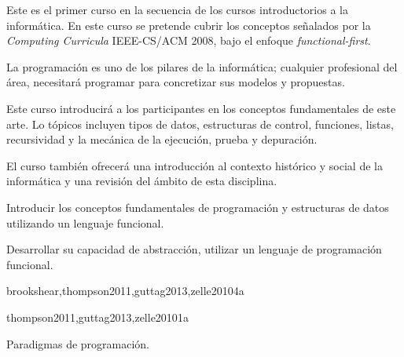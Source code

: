 \begin{syllabus}


\begin{justification}
Este es el primer curso en la secuencia de los cursos introductorios a la informática. En este curso se pretende cubrir los conceptos señalados por la \textit{Computing Curricula} IEEE-CS/ACM 2008, bajo el enfoque \textit{functional-first}.

La programación es uno de los pilares de la informática; cualquier profesional del área, necesitará programar para concretizar sus modelos y propuestas.

Este curso introducirá a los participantes en los conceptos fundamentales de este arte. Lo tópicos incluyen tipos de datos, estructuras de control, funciones, listas, recursividad y la mecánica de la ejecución, prueba y depuración.

El curso también ofrecerá una introducción al contexto histórico y social de la informática y una revisión del ámbito de esta disciplina.
\end{justification}

\begin{goals}
\item Introducir los conceptos fundamentales de programación y estructuras de datos utilizando un lenguaje funcional.
\item Desarrollar su capacidad de abstracción, utilizar un lenguaje de programación funcional.
\end{goals}




\begin{unit}{\SPHistoryOfComputingDef}{}{brookshear,thompson2011,guttag2013,zelle2010}{4}{a}
    \SPHistoryOfComputingAllTopics
    \SPHistoryOfComputingAllObjectives
\end{unit}

\begin{unit}{\PLOverviewDef}{}{thompson2011,guttag2013,zelle2010}{1}{a}
   \begin{topics}
      \item \PLOverviewTopicHistory
      \item Paradigmas de programación.
   \end{topics}

   \begin{learningoutcomes}
      \item \PLOverviewObjONE
      \item \PLOverviewObjTWO
   \end{learningoutcomes}
\end{unit}


\end{syllabus}
